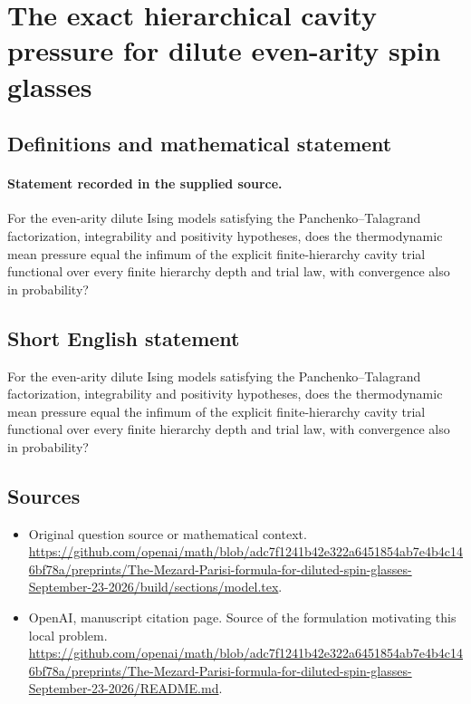 \documentclass[11pt]{article}
\begin{document}
\section*{The exact hierarchical cavity pressure for dilute even-arity spin glasses}\label{statement}
\subsection{Definitions and mathematical statement}
\paragraph{Statement recorded in the supplied source.}
For the even-arity dilute Ising models satisfying the Panchenko–Talagrand factorization, integrability and positivity hypotheses, does the thermodynamic mean pressure equal the infimum of the explicit finite-hierarchy cavity trial functional over every finite hierarchy depth and trial law, with convergence also in probability?
\subsection{Short English statement}
For the even-arity dilute Ising models satisfying the Panchenko–Talagrand factorization, integrability and positivity hypotheses, does the thermodynamic mean pressure equal the infimum of the explicit finite-hierarchy cavity trial functional over every finite hierarchy depth and trial law, with convergence also in probability?
\subsection{Sources}
\begin{itemize}
\item[S1] Original question source or mathematical context.
\url{https://github.com/openai/math/blob/adc7f1241b42e322a6451854ab7e4b4c146bf78a/preprints/The-Mezard-Parisi-formula-for-diluted-spin-glasses-September-23-2026/build/sections/model.tex}.
\item[S2] OpenAI, manuscript citation page. Source of the formulation motivating this local problem.
\url{https://github.com/openai/math/blob/adc7f1241b42e322a6451854ab7e4b4c146bf78a/preprints/The-Mezard-Parisi-formula-for-diluted-spin-glasses-September-23-2026/README.md}.
\end{itemize}
\end{document}
